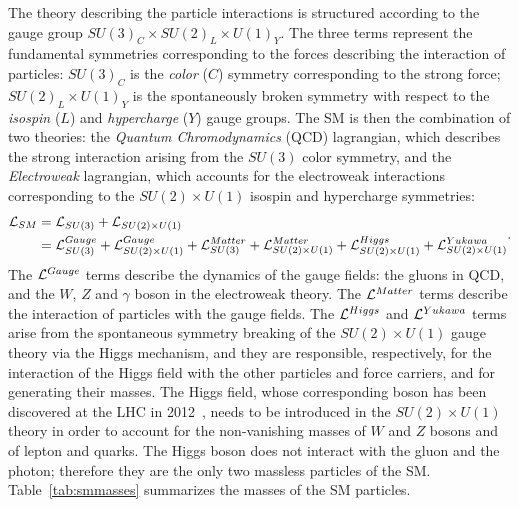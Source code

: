 The theory describing the particle interactions is structured
according to the gauge group $SU(3)_C\times{}SU(2)_L\times{}U(1)_Y$. The three
terms represent the fundamental symmetries corresponding to the forces describing the
interaction of particles: $SU(3)_C$ is the {\it color} ($C$) symmetry corresponding
to the strong force; $SU(2)_L\times{}U(1)_Y$ is the spontaneously
broken symmetry with respect to the {\it isospin} ($L$)
and {\it hypercharge} ($Y$) gauge groups.
The SM is then the combination of two theories: the {\it Quantum
  Chromodynamics} (QCD) lagrangian, which describes the strong
interaction arising from the $SU(3)$ color symmetry, and the {\it
  Electroweak} lagrangian, which accounts for the electroweak
interactions corresponding to the $SU(2)\times{}U(1)$ isospin and
hypercharge symmetries:
\begin{equation}
\begin{split}
\mathcal{L}{}_{SM}  & = \mathcal{L}{}_{SU(3)} + \mathcal{L}{}_{SU(2)\times{}U(1)} \\
& = \mathcal{L}{}_{SU(3)}^{Gauge} 
+ \mathcal{L}{}_{SU(2)\times{}U(1)}^{Gauge} 
+ \mathcal{L}{}_{SU(3)}^{Matter}
+ \mathcal{L}{}_{SU(2)\times{}U(1)}^{Matter}
+ \mathcal{L}{}_{SU(2)\times{}U(1)}^{Higgs} +
\mathcal{L}{}_{SU(2)\times{}U(1)}^{Yukawa} \\
\end{split}
.
\end{equation}
The $\mathcal{L}{}^{Gauge}$ terms describe the dynamics of the gauge fields:
the gluons in QCD, and the $W$, $Z$ and $\gamma$ boson in the
electroweak theory.
The $\mathcal{L}{}^{Matter}$ terms describe the
interaction of particles with the gauge fields. The $\mathcal{L}{}^{Higgs}$
and $\mathcal{L}{}^{Yukawa}$ terms arise from the spontaneous symmetry
breaking of the $SU(2)\times{}U(1)$ gauge theory via the Higgs
mechanism, and they are responsible, respectively, for the interaction
of the Higgs field with the other particles and force carriers, and
for generating their masses.
The Higgs field, whose corresponding boson has been discovered at the
LHC in 2012~\cite{Aad:2012tfa,Chatrchyan:2012ufa},
needs to be introduced in
the $SU(2)\times{}U(1)$ theory in order to account for the
non-vanishing masses of $W$ and $Z$ bosons and of lepton and quarks.
The Higgs boson does not interact with the gluon and the photon;
therefore they are the only two massless particles of the
SM. Table~\ref{tab:smmasses} summarizes the masses of the SM particles.

